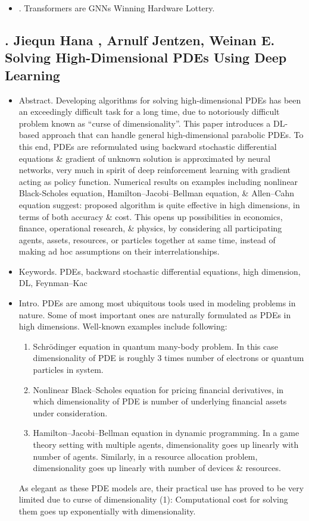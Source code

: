 \documentclass{article}
\begin{document}
\begin{itemize}
    \item {. Transformers are GNNs Winning Hardware Lottery.}
\end{itemize}


\subsection{\cite{Han_Jentzen_Weinan2018}. {\sc Jiequn Hana , Arnulf Jentzen, Weinan E}. Solving High-Dimensional PDEs Using Deep Learning}
{\sf[2102 citations]}
\begin{itemize}
	\item {\sf Abstract.} Developing algorithms for solving high-dimensional PDEs has been an exceedingly difficult task for a long time, due to notoriously difficult problem known as ``curse of dimensionality''. This paper introduces a DL-based approach that can handle general high-dimensional parabolic PDEs. To this end, PDEs are reformulated using backward stochastic differential equations \& gradient of unknown solution is approximated by neural networks, very much in spirit of deep reinforcement learning with gradient acting as policy function. Numerical results on examples including nonlinear Black-Scholes equation, Hamilton--Jacobi--Bellman equation, \& Allen--Cahn equation suggest: proposed algorithm is quite effective in high dimensions, in terms of both accuracy \& cost. This opens up possibilities in economics, finance, operational research, \& physics, by considering all participating agents, assets, resources, or particles together at same time, instead of making ad hoc assumptions on their interrelationships.
	\item {\sf Keywords.} PDEs, backward stochastic differential equations, high dimension, DL, Feynman--Kac
	\item {\sf Intro.} PDEs are among most ubiquitous tools used in modeling problems in nature. Some of most important ones are naturally formulated as PDEs in high dimensions. Well-known examples include following:
	\begin{enumerate}
		\item Schr\"odinger equation in quantum many-body problem. In this case dimensionality of PDE is roughly 3 times number of electrons or quantum particles in system.
		\item Nonlinear Black--Scholes equation for pricing financial derivatives, in which dimensionality of PDE is number of underlying financial assets under consideration.
		\item Hamilton--Jacobi--Bellman equation in dynamic programming. In a game theory setting with multiple agents, dimensionality goes up linearly with number of agents. Similarly, in a resource allocation problem, dimensionality goes up linearly with number of devices \& resources.
	\end{enumerate}
	As elegant as these PDE models are, their practical use has proved to be very limited due to curse of dimensionality (1): Computational cost for solving them goes up exponentially with dimensionality.


\end{itemize}
\end{document}
